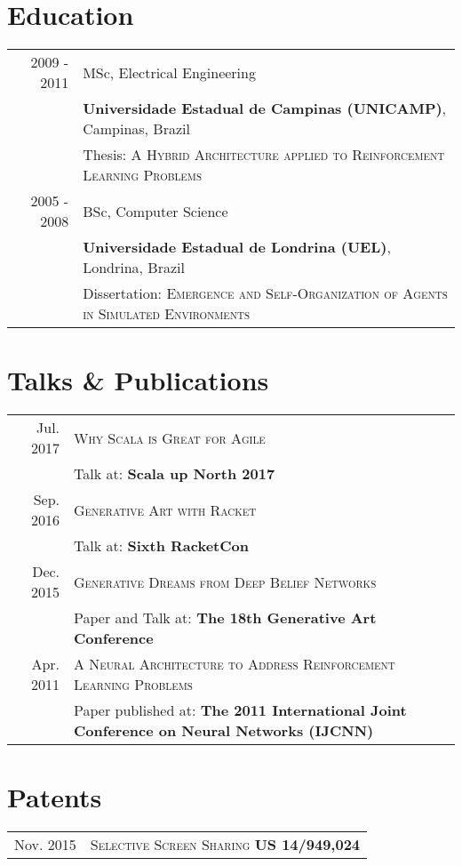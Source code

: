 \documentclass[a4paper,10pt]{article}
\begin{document}

\section{Education}
\begin{tabular}{rl}
2009 - 2011 & MSc, Electrical Engineering\\
& \textbf{Universidade Estadual de Campinas (UNICAMP)}, Campinas, Brazil\\
& Thesis: \textsc{A Hybrid Architecture applied to Reinforcement Learning Problems} \\
2005 - 2008 & BSc, Computer Science\\
& \textbf{Universidade Estadual de Londrina (UEL)}, Londrina, Brazil\\
& Dissertation: \textsc{Emergence and Self-Organization of Agents in Simulated Environments}
\end{tabular}

\section{Talks \& Publications}
\begin{tabular}{rl}
 Jul. 2017 & \textsc{Why Scala is Great for Agile}\\
                   & Talk at: \textbf{Scala up North 2017}\\
 Sep. 2016 & \textsc{Generative Art with Racket}\\
                     & Talk at: \textbf{Sixth RacketCon}\\
 Dec. 2015 & \textsc{Generative Dreams from Deep Belief Networks}\\
                   & Paper and Talk at: \textbf{The 18th Generative Art Conference}\\
 Apr. 2011 & \textsc{A Neural Architecture to Address Reinforcement Learning Problems}\\
                   & Paper published at: \textbf{The 2011 International Joint Conference on Neural Networks (IJCNN)}\\
\end{tabular}

\section{Patents}
\begin{tabular}{rl}
 Nov. 2015 & \textsc{Selective Screen Sharing} \textbf{US 14/949,024}\\
\end{tabular}
\end{document}
